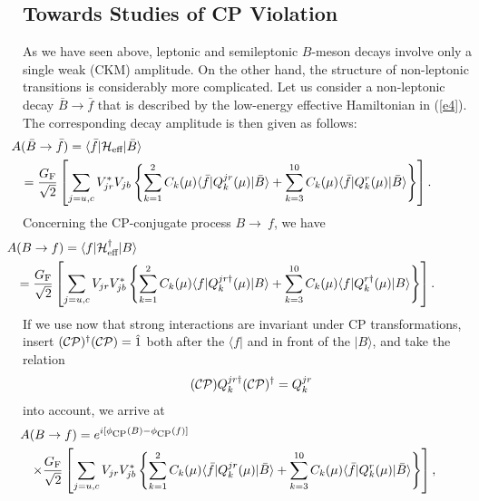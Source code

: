 \documentclass[12pt]{article}
\begin{document}
%
%
%
\subsection{Towards Studies of CP Violation}\label{To-CP}
%
%
%
As we have seen above, leptonic and semileptonic $B$-meson decays
involve only a single weak (CKM) amplitude. On the other hand, the 
structure of non-leptonic transitions is considerably more complicated. 
Let us consider a non-leptonic decay $\bar B\to\bar f$ that is described by
the low-energy effective Hamiltonian  in (\ref{e4}). The corresponding
decay amplitude is then given as follows:
\begin{eqnarray}
\lefteqn{\hspace*{-1.3truecm}A(\bar B\to \bar f)=\langle \bar f\vert
{\cal H}_{\mbox{{\scriptsize eff}}}\vert\bar B\rangle}\nonumber\\
&&\hspace*{-1.3truecm}=\frac{G_{\mbox{{\scriptsize F}}}}{\sqrt{2}}\left[
\sum\limits_{j=u,c}V_{jr}^\ast V_{jb}\left\{\sum\limits_{k=1}^2
C_{k}(\mu)\langle \bar f\vert Q_{k}^{jr}(\mu)\vert\bar B\rangle
+\sum\limits_{k=3}^{10}C_{k}(\mu)\langle \bar f\vert Q_{k}^r(\mu)
\vert\bar B\rangle\right\}\right].~~~\mbox{}\label{Bbarfbar-ampl}
\end{eqnarray}
Concerning the CP-conjugate process $B\to\ f$, we have
\begin{eqnarray}
\lefteqn{\hspace*{-1.3truecm}A(B \to f)=\langle f|
{\cal H}_{\mbox{{\scriptsize 
eff}}}^\dagger|B\rangle}\nonumber\\
&&\hspace*{-1.3truecm}=\frac{G_{\mbox{{\scriptsize F}}}}{\sqrt{2}}
\left[\sum\limits_{j=u,c}V_{jr}V_{jb}^\ast \left\{\sum\limits_{k=1}^2
C_{k}(\mu)\langle f\vert Q_{k}^{jr\dagger}(\mu)\vert B\rangle
+\sum\limits_{k=3}^{10}C_{k}(\mu)\langle f\vert Q_k^{r\dagger}(\mu)
\vert B\rangle\right\}\right].~~~\mbox{}\label{Bf-ampl}
\end{eqnarray}
If we use now that strong interactions are invariant under CP transformations, 
insert $({\cal CP})^\dagger({\cal CP})=\hat 1$ both after the $\langle f|$ and in 
front of the $|B\rangle$, and take the relation 
\begin{equation}
({\cal CP})Q_k^{jr\dagger}({\cal CP})^\dagger=Q_k^{jr}
\end{equation}
into account, we arrive at
\begin{eqnarray}
\lefteqn{\hspace*{-1.3truecm}A(B \to f)=
e^{i[\phi_{\mbox{{\scriptsize CP}}}(B)-\phi_{\mbox{{\scriptsize CP}}}(f)]}}\nonumber\\
&&\hspace*{-1.3truecm}\times\frac{G_{\mbox{{\scriptsize F}}}}{\sqrt{2}}
\left[\sum\limits_{j=u,c}V_{jr}V_{jb}^\ast\left\{\sum\limits_{k=1}^2
C_{k}(\mu)\langle \bar f\vert Q_{k}^{jr}(\mu)\vert\bar B\rangle
+\sum\limits_{k=3}^{10}C_{k}(\mu)
\langle \bar f\vert Q_{k}^r(\mu)\vert\bar B\rangle\right\}\right],
\end{eqnarray}
\end{document}
